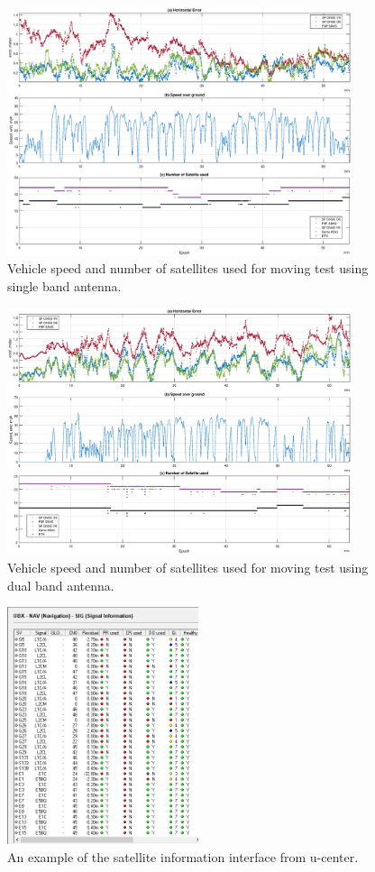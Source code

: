 \documentclass[letterpaper, 10 pt,onecolumn]{article}
\begin{document}
	\begin{figure}[H]
		\centering
		\includegraphics[width=0.9\textwidth]{figures/dynamicinfo_single.eps}
		\caption{Vehicle speed and number of satellites used for moving test using single band antenna.}
		\label{fig:m1vspeed}
	\end{figure}

	\begin{figure}[H]
		\centering
		\includegraphics[width=0.9\textwidth]{figures/dynamicinfo_dual.eps}
		\caption{Vehicle speed and number of satellites used for moving test using dual band antenna.}
		\label{fig:m2vspeed}
	\end{figure}

	\begin{figure}[H]
		\centering
		\includegraphics[width=0.5\textwidth]{figures/nav_sig.png}
		\caption{An example of the satellite information interface from u-center.}
		\label{fig:ubxqi}
	\end{figure}

    
    
\end{document}
